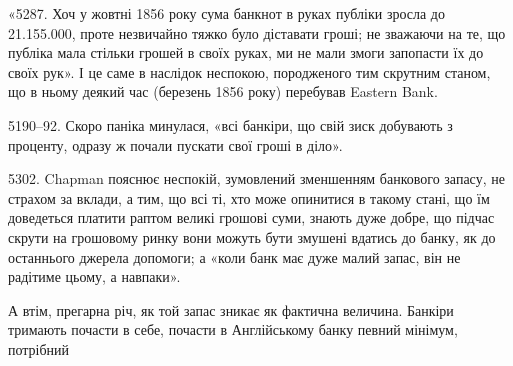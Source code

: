 «5287. Хоч у жовтні 1856 року сума банкнот в руках публіки зросла%
\break
до \num{21.155.000}, проте незвичайно тяжко було діставати гроші; не зважаючи
на те, що публіка мала стільки грошей в своїх руках, ми не мали змоги запопасти
їх до своїх рук». І це саме в наслідок неспокою, породженого тим
скрутним станом, що в ньому деякий час (березень 1856 року) перебував
Eastern Bank.

5190--92. Скоро паніка минулася, «всі банкіри, що свій зиск добувають
з проценту, одразу ж почали пускати свої гроші в діло».

5302. Chapman пояснює неспокій, зумовлений зменшенням банкового
запасу, не страхом за вклади, а тим, що всі ті, хто може опинитися в такому
стані, що їм доведеться платити раптом великі грошові суми, знають дуже добре,
що підчас скрути на грошовому ринку вони можуть бути змушені вдатись до
банку, як до останнього джерела допомоги; а «коли банк має дуже малий запас,
він не радітиме цьому, а навпаки».

А втім, прегарна річ, як той запас зникає як фактична величина. Банкіри
тримають почасти в себе, почасти в Англійському банку певний мінімум, потрібний
\parbreak{}  %

